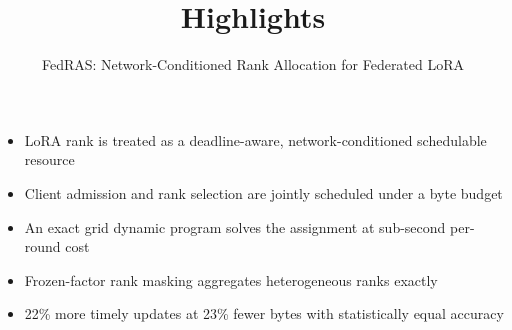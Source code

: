 \documentclass[12pt]{article}
\title{Highlights}
\author{FedRAS: Network-Conditioned Rank Allocation for Federated LoRA}
\date{}
\begin{document}
\maketitle
\begin{itemize}
\item LoRA rank is treated as a deadline-aware, network-conditioned schedulable resource
\item Client admission and rank selection are jointly scheduled under a byte budget
\item An exact grid dynamic program solves the assignment at sub-second per-round cost
\item Frozen-factor rank masking aggregates heterogeneous ranks exactly
\item 22\% more timely updates at 23\% fewer bytes with statistically equal accuracy
\end{itemize}
\end{document}
